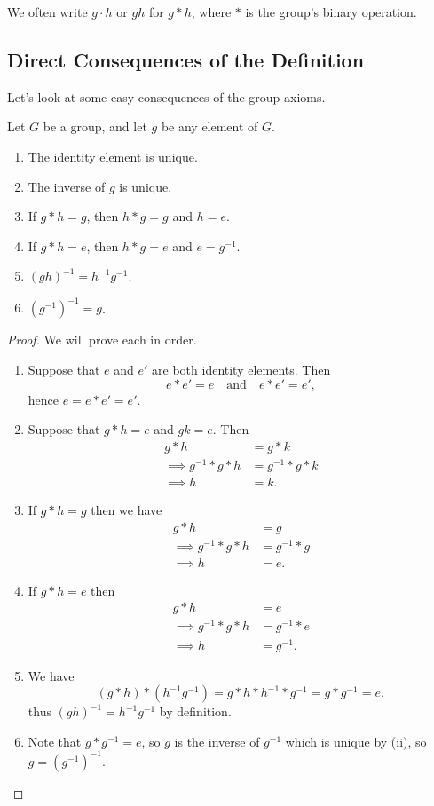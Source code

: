 \documentclass[a4]{scrartcl}
\begin{document}
\begin{notation}
	We often write $g \cdot h$ or $gh$ for $g * h$, where $*$ is the group's binary operation.
\end{notation}

\subsection{Direct Consequences of the Definition}

Let's look at some easy consequences of the group axioms.

\begin{proposition}
	Let $G$ be a group, and let $g$ be any element of $G$.
	\begin{enumerate}[label=(\roman*)]
		\item The identity element is unique.
		\item The inverse of $g$ is unique.
		\item If $g*h = g$, then $h * g = g$ and $h = e$.
		\item If $g * h = e$, then $h * g = e$ and $e = g^{-1}$.
		\item $(gh)^{-1} = h^{-1} g^{-1}$.
		\item $(g^{-1})^{-1} = g$.
	\end{enumerate}
\end{proposition}
\begin{proof}
	We will prove each in order.
	\begin{enumerate}[label=(\roman*)]
		\item Suppose that $e$ and $e'$ are both identity elements. Then
		$$
		e * e' = e \quad \text{and} \quad e * e' = e',
		$$
		hence $e = e * e' = e'$.
		\item Suppose that $g*h = e$ and $gk = e$. Then
		\begin{align*}
			g * h &= g * k \\
			\implies g^{-1} * g * h &= g^{-1} * g * k \\
			\implies h &= k.
		\end{align*}
		\item If $g * h = g$ then we have
		\begin{align*}
			g * h &= g \\
		\implies g^{-1} * g * h &= g^{-1} * g \\
		\implies h &= e.
		\end{align*}
		\item If $g * h = e$ then
		\begin{align*}
			g * h &= e \\
			\implies g^{-1} * g * h &= g^{-1} * e \\
			\implies h &= g^{-1}.
		\end{align*}
		\item We have
		$$
		(g*h) * (h^{-1} g^{-1}) = g * h * h^{-1} * g^{-1} = g * g^{-1} = e, 
		$$
		thus $(gh)^{-1} = h^{-1} g^{-1}$ by definition.
		\item Note that $g * g^{-1} = e$, so $g$ is the inverse of $g^{-1}$ which is unique by (ii), so $g = (g^{-1})^{-1}$.
	\end{enumerate}
\end{proof}
\end{document}

